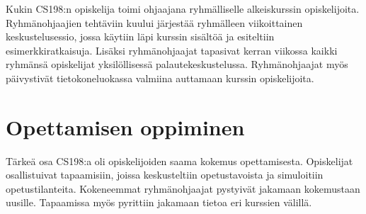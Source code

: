 \documentclass[finnish]{tktltiki2}
\theoremstyle{definition}
\theoremstyle{remark}
\begin{document}
Kukin CS198:n opiskelija toimi ohjaajana ryhmälliselle alkeiskurssin opiskelijoita. Ryhmänohjaajien tehtäviin kuului järjestää ryhmälleen viikoittainen keskustelusessio, jossa käytiin läpi kurssin sisältöä ja esiteltiin esimerkkiratkaisuja. Lisäksi ryhmänohjaajat tapasivat kerran viikossa kaikki ryhmänsä opiskelijat yksilöllisessä palautekeskustelussa. Ryhmänohjaajat myös päivystivät tietokoneluokassa valmiina auttamaan kurssin opiskelijoita.


\section{Opettamisen oppiminen}

Tärkeä osa CS198:a oli opiskelijoiden saama kokemus opettamisesta. Opiskelijat osallistuivat tapaamisiin, joissa keskusteltiin opetustavoista ja simuloitiin opetustilanteita. Kokeneemmat ryhmänohjaajat pystyivät jakamaan kokemustaan uusille. Tapaamissa myös pyrittiin jakamaan tietoa eri kurssien välillä.





\end{document}
